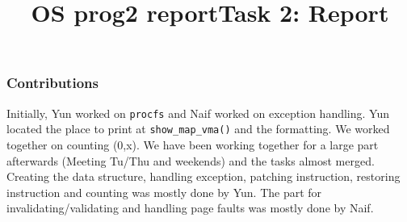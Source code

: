 \documentclass[]{article}
\title{OS prog2 report}
\title{Task 2: Report}
\begin{document}
\maketitle

\subsubsection{Contributions}\label{Contributions}

Initially, Yun worked on \texttt{procfs} and Naif worked on exception handling. Yun located the place to print at \texttt{show\_map\_vma()} and the formatting. We worked together on counting (0,x). We have been working together for a large part afterwards (Meeting Tu/Thu and weekends) and the tasks almost merged. Creating the data structure, handling exception, patching instruction, restoring instruction and counting was mostly done by Yun. The part for invalidating/validating and handling page faults was mostly done by Naif. 
\end{document}
